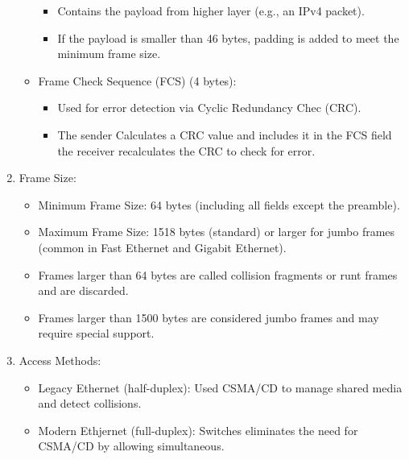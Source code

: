 \documentclass[a4paper,11pt]{article}
\begin{document}
\begin{enumerate}
\begin{itemize}
\begin{itemize}
            \item Contains the payload from higher layer (e.g., an IPv4 packet).\\
            \item If the payload is smaller than 46 bytes, padding is added to meet the minimum frame size.\\
        \end{itemize}
        \item Frame Check Sequence (FCS) (4 bytes):\\ 
        \begin{itemize}
            \item Used for error detection via Cyclic Redundancy Chec (CRC).\\
            \item The sender Calculates a CRC value and includes it in the FCS field the receiver recalculates the CRC to check for error.\\
        \end{itemize}
    \end{itemize}
    \item Frame Size:\\
    \begin{itemize}
        \item Minimum Frame Size: 64 bytes (including all fields except the preamble).\\
        \item Maximum Frame Size: 1518 bytes (standard) or larger for jumbo frames (common in Fast Ethernet and Gigabit Ethernet).\\
        \item Frames larger than 64 bytes are called collision fragments or runt frames and are discarded.\\
        \item Frames larger than 1500 bytes are considered jumbo frames and may require special support.
    \end{itemize}
    \item Access Methods:\\
    \begin{itemize}
        \item Legacy Ethernet (half-duplex): Used CSMA/CD to manage shared media and detect collisions.\\
        \item Modern Ethjernet (full-duplex): Switches eliminates the need for CSMA/CD by allowing simultaneous.\\
    \end{itemize}
\end{enumerate}
\end{document}
